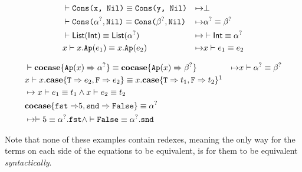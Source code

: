 \documentclass[twoside,12pt,a4paper]{article}
\begin{document}
\begin{example}
    \begin{align*}
    &\vdash \texttt{Cons(x, Nil)} \equiv \texttt{Cons(y, Nil)}&\mapsto& \bot
    \\
    &\vdash \texttt{Cons(}\alpha^?, \texttt{Nil)}\equiv\texttt{Cons(}\beta^?, \texttt{Nil)}
    &\mapsto&\alpha^?\equiv \beta^?
    \\
    &\vdash \mathsf{List(Int)}\equiv \mathsf{List(\alpha^?)}
    &\mapsto& \vdash \mathsf{Int}\equiv \alpha^?
    \\
    &x \vdash x.\texttt{Ap}(e_1)\equiv x.\texttt{Ap}(e_2) &\mapsto& x\vdash e_1\equiv e_2 
    \end{align*}
\end{example}


\begin{example}
    \begin{align*}
    &\vdash \excopatmatch{\Ap{x}\Rightarrow \alphaunifvar} \equiv \excopatmatch{\Ap{x}\Rightarrow\betaunifvar} 
    &\mapsto&x\vdash \alphaunifvar \equiv \betaunifvar
    \\
    &x\vdash x.\expatmatch{\texttt{T} \Rightarrow e_2, \texttt{F} \Rightarrow e_2} \equiv x.\expatmatch{\texttt{T} \Rightarrow t_1, \texttt{F} \Rightarrow t_2}\footnotemark{}
    \\ &\mapsto x\vdash  e_1 \equiv t_1\wedge x\vdash e_2\equiv t_2
    \\
    &\excopatmatch{\mathtt{fst \Rightarrow} 5, \mathtt{snd\Rightarrow False}}\equiv \alphaunifvar
    \\ &\mapsto \vdash 5\equiv \alphaunifvar.\mathtt{fst}\wedge \vdash \mathtt{False\equiv\alphaunifvar.snd}
    \end{align*}
\end{example}



Note that none of these examples contain redexes, meaning the only way for the terms on each side of the equations to be equivalent,
is for them to be equivalent \textit{syntactically}. %
\end{document}
